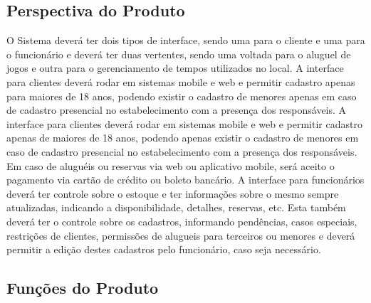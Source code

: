 \documentclass{article}
\begin{document}
    \subsection{Perspectiva do Produto} 
    O Sistema deverá ter dois tipos de interface, sendo uma para o cliente e uma para o funcionário e deverá ter duas vertentes, sendo uma voltada para o aluguel de jogos e outra para o gerenciamento de tempos utilizados no local. A interface para clientes deverá rodar em sistemas mobile e web e permitir cadastro apenas para maiores de 18 anos, podendo existir o cadastro de menores apenas em caso de cadastro presencial no estabelecimento com a presença dos responsáveis.\newline
    A interface para clientes deverá rodar em sistemas mobile e web e permitir cadastro apenas de maiores de 18 anos, podendo apenas existir o cadastro de menores em caso de cadastro presencial no estabelecimento com a presença dos responsáveis. Em caso de aluguéis ou reservas via web ou aplicativo mobile, será aceito o pagamento via cartão de crédito ou boleto bancário.\newline
    A interface para funcionários deverá ter controle sobre o estoque e ter informações sobre o mesmo sempre atualizadas, indicando a disponibilidade, detalhes, reservas, etc. Esta também deverá ter o controle sobre os cadastros, informando pendências, casos especiais, restrições de clientes, permissões de alugueis para terceiros ou menores e deverá permitir a edição destes cadastros pelo funcionário, caso seja necessário.
    
    \newpage
    \subsection{Funções do Produto}
\end{document}
